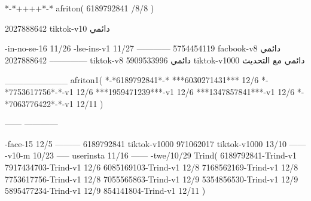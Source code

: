 *-*++++*-*
afriton(
6189792841 /8/8
)

2027888642 tiktok-v10
دائمي

-in-no-se-16 11/26
-lse-ins-v1 11/27
------------
5754454119 facbook-v8
دائمي
--------------
2027888642 tiktok-v8
دائمي
5909533996 tiktok-v1000
دائمي مع التحديث

__________
afriton1(
*-*6189792841*-*
***6030271431*** 12/6
*-*7753617756*-*-v1 12/6
***1959471239***-v1 12/6
***1347857841***-v1 12/6
*-*7063776422*-*-v1 12/11
)

------
------------


-face-15 12/5
---------
6189792841 tiktok-v1000
971062017 tiktok-v1000 13/10
------
-v10-m 10/23
-----
userinsta 11/16
------
-twe/10/29
Trind(
6189792841-Trind-v1 
7917434703-Trind-v1 12/6
6085169103-Trind-v1 12/8
7168562169-Trind-v1 12/8
7753617756-Trind-v1 12/8
7055565863-Trind-v1 12/9
5354856530-Trind-v1 12/9
5895477234-Trind-v1 12/9
854141804-Trind-v1 12/11
)

